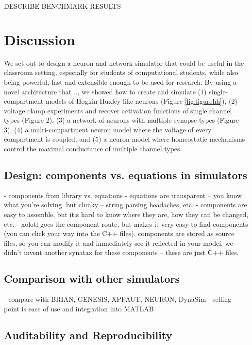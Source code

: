 \documentclass{frontiersSCNS} %
\begin{document}
DESCRIBE BENCHMARK RESULTS

%
%
%
%
%
%

\section{Discussion}
\label{discussion}

We set out to design a neuron and network simulator that could be useful in the classroom setting, especially for students of computational students, while also being powerful, fast and extensible enough to be used for research. By using a novel architecture that .., we showed how to create and simulate (1) single-compartment models of Hogkin-Huxley like neurons (Figure \ref{fig:figurehh}), (2) voltage clamp experiments and recover activation functions of single channel types (Figure 2), (3) a network of neurons with multiple synapse types (Figure 3), (4) a multi-compartment neuron model where the voltage of every compartment is coupled, and (5) a neuron model where homeostatic mechanisms control the maximal conductance of multiple channel types. 


\subsection{Design: components vs. equations in simulators }

- components from library vs. equations
- equations are transparent -- you know what you're solving. but clunky -- string parsing headaches, etc. 
- components are easy to assemble, but it;s hard to know where they are, how they can be changed, etc.
- xolotl goes the component route, but makes it very easy to find components (you can click your way into the C++ files). components are stored as source files, so you can modify it and immediately see it reflected in your model. we didn't invent another synatax for these components -- these are just C++ files. 

\subsection{Comparison with other simulators}

- compare with BRIAN, GENESIS, XPPAUT, NEURON, DynaSim
- selling point is ease of use and integration into MATLAB

\subsection{Auditability and Reproducibility}
\end{document}
